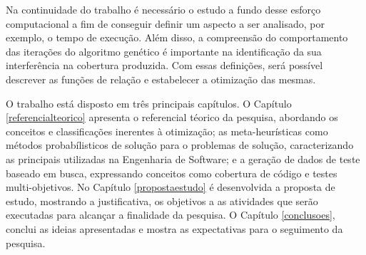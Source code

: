Na continuidade do trabalho é necessário o estudo a fundo desse esforço computacional a fim de conseguir definir um aspecto a ser analisado, por exemplo, o tempo de execução. Além disso, a compreensão do comportamento das iterações do algoritmo genético é importante na identificação da sua interferência na cobertura produzida. Com essas definições, será possível descrever as funções de relação e estabelecer a otimização das mesmas. 

O trabalho está disposto em três principais capítulos. O Capítulo \ref{referencialteorico} apresenta o referencial téorico da pesquisa, abordando os conceitos e classificações inerentes à otimização; as meta-heurísticas como métodos probabílisticos de solução para o problemas de solução, caracterizando as principais utilizadas na Engenharia de Software; e a geração de dados de teste baseado em busca, expressando conceitos como cobertura de código e testes multi-objetivos. No Capítulo \ref{propostaestudo} é desenvolvida a proposta de estudo, mostrando a justificativa, os objetivos a as atividades que serão executadas para alcançar a finalidade da pesquisa. O Capítulo \ref{conclusoes}, conclui as ideias apresentadas e mostra as expectativas para o seguimento da pesquisa.

